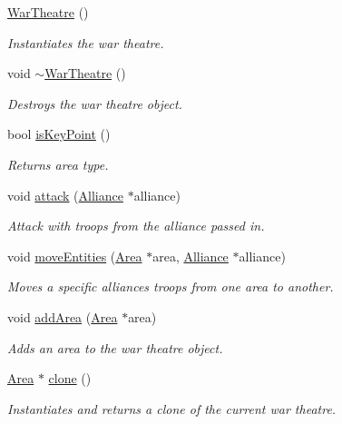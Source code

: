 \begin{DoxyCompactItemize}
\item 
\mbox{\label{classWarTheatre_aeac00db856afa4a7223d265093c7eca2}} 
\hyperlink{classWarTheatre_aeac00db856afa4a7223d265093c7eca2}{War\+Theatre} ()
\begin{DoxyCompactList}\small\item\em Instantiates the war theatre. \end{DoxyCompactList}\item 
void \hyperlink{classWarTheatre_a4be07a7321747894bd035ec130a06c56}{$\sim$\+War\+Theatre} ()
\begin{DoxyCompactList}\small\item\em Destroys the war theatre object. \end{DoxyCompactList}\item 
bool \hyperlink{classWarTheatre_a01845ca2cc01367101b2884f2902bf88}{is\+Key\+Point} ()
\begin{DoxyCompactList}\small\item\em Returns area type. \end{DoxyCompactList}\item 
void \hyperlink{classWarTheatre_a9c1a612347b0da87a0421e37f6b7b12b}{attack} (\hyperlink{classAlliance}{Alliance} $\ast$alliance)
\begin{DoxyCompactList}\small\item\em Attack with troops from the alliance passed in. \end{DoxyCompactList}\item 
void \hyperlink{classWarTheatre_ab26cd475022390aefc1e4c6475e194ac}{move\+Entities} (\hyperlink{classArea}{Area} $\ast$area, \hyperlink{classAlliance}{Alliance} $\ast$alliance)
\begin{DoxyCompactList}\small\item\em Moves a specific alliances troops from one area to another. \end{DoxyCompactList}\item 
void \hyperlink{classWarTheatre_adc871336a6bf1263216b0f87da04cc57}{add\+Area} (\hyperlink{classArea}{Area} $\ast$area)
\begin{DoxyCompactList}\small\item\em Adds an area to the war theatre object. \end{DoxyCompactList}\item 
\hyperlink{classArea}{Area} $\ast$ \hyperlink{classWarTheatre_a501f851edf6f5ad00770414e50505175}{clone} ()
\begin{DoxyCompactList}\small\item\em Instantiates and returns a clone of the current war theatre. \end{DoxyCompactList}\end{DoxyCompactItemize}


